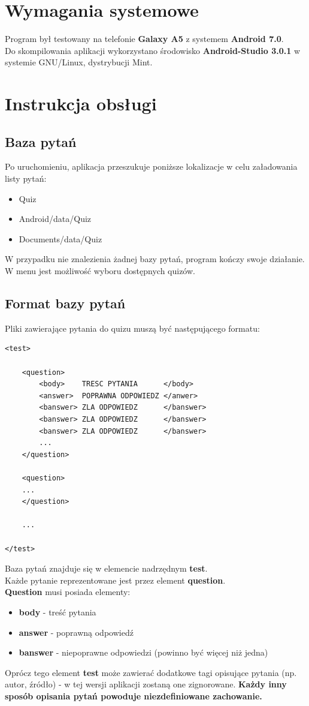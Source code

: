 \documentclass[12pt, a4paper]{article}
\begin{document}
\section{Wymagania systemowe}
Program był testowany na telefonie \textbf{Galaxy A5} z systemem \textbf{Android 7.0}.\\
Do skompilowania aplikacji wykorzystano środowisko \textbf{Android-Studio 3.0.1} w systemie GNU/Linux, dystrybucji Mint.

\section{Instrukcja obsługi}

\subsection{Baza pytań}
Po uruchomieniu, aplikacja przeszukuje poniższe lokalizacje w celu załadowania listy pytań:
\begin{itemize}
\item Quiz
\item Android/data/Quiz
\item Documents/data/Quiz
\end{itemize}
W przypadku nie znalezienia żadnej bazy pytań, program kończy swoje działanie.\\
W menu jest możliwość wyboru dostępnych quizów.
\newpage

\subsection{Format bazy pytań}
Pliki zawierające pytania do quizu muszą być następującego formatu:
\begin{lstlisting}
<test>

	<question>
		<body>    TRESC PYTANIA      </body>
		<answer>  POPRAWNA ODPOWIEDZ </anwer>
		<banswer> ZLA ODPOWIEDZ      </banswer>
		<banswer> ZLA ODPOWIEDZ      </banswer>
		<banswer> ZLA ODPOWIEDZ      </banswer>
		...
	</question>

	<question>
	...
	</question>

	...

</test>
\end{lstlisting}
Baza pytań znajduje się w elemencie nadrzędnym \textbf{test}.\\
Każde pytanie reprezentowane jest przez element \textbf{question}.\\
\textbf{Question} musi posiada elementy:
\begin{itemize}
\item \textbf{body} - treść pytania
\item \textbf{answer} - poprawną odpowiedź
\item \textbf{banswer} - niepoprawne odpowiedzi (powinno być więcej niż jedna)
\end{itemize}
Oprócz tego element \textbf{test} może zawierać dodatkowe tagi opisujące pytania (np. autor, źródło) - w tej wersji aplikacji zostaną one zignorowane.
\textbf{Każdy inny sposób opisania pytań powoduje niezdefiniowane zachowanie.}
\end{document}
